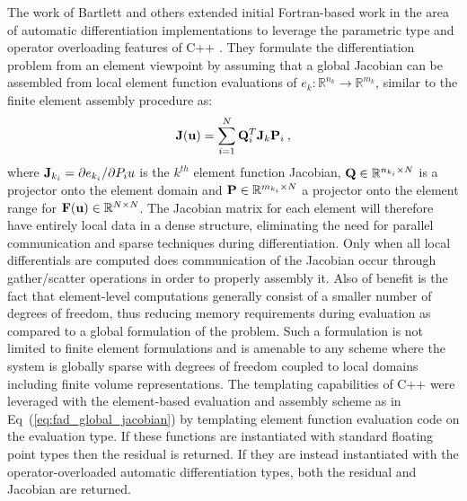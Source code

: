 The work of Bartlett and others \citep{hutchison_automatic_2006}
extended initial Fortran-based work in the area of automatic
differentiation implementations to leverage the parametric type and
operator overloading features of C++ \citep{stroustrup_c++_1997}. They
formulate the differentiation problem from an element viewpoint by
assuming that a global Jacobian can be assembled from local element
function evaluations of $e_k : \mathbb{R}^{n_k} \rightarrow
\mathbb{R}^{m_k}$, similar to the finite element assembly procedure
as:
\begin{equation}
  \mathbf{J}(\mathbf{u}) = \sum_{i=1}^N \mathbf{Q}^T_i \mathbf{J}_k \mathbf{P}_i\:,
  \label{eq:fad_global_jacobian}
\end{equation}
where $\mathbf{J}_{k_i} = \partial e_{k_i} / \partial P_i u$ is the
$k^{th}$ element function Jacobian, $\mathbf{Q} \in \mathbb{R}^{n_{k_i}
  \times N}$ is a projector onto the element domain and $\mathbf{P} \in
\mathbb{R}^{m_{k_i} \times N}$ a projector onto the element range for
$\mathbf{F}(\mathbf{u}) \in \mathbb{R}^{N \times N}$. The Jacobian matrix for
each element will therefore have entirely local data in a dense
structure, eliminating the need for parallel communication and sparse
techniques during differentiation. Only when all local differentials
are computed does communication of the Jacobian occur through
gather/scatter operations in order to properly assembly it. Also of
benefit is the fact that element-level computations generally consist
of a smaller number of degrees of freedom, thus reducing memory
requirements during evaluation as compared to a global formulation of
the problem. Such a formulation is not limited to finite element
formulations and is amenable to any scheme where the system is
globally sparse with degrees of freedom coupled to local domains
including finite volume representations. The templating capabilities
of C++ were leveraged with the element-based evaluation and assembly
scheme as in Eq~(\ref{eq:fad_global_jacobian}) by templating element
function evaluation code on the evaluation type. If these functions
are instantiated with standard floating point types then the residual
is returned. If they are instead instantiated with the
operator-overloaded automatic differentiation types, both the residual
and Jacobian are returned.

